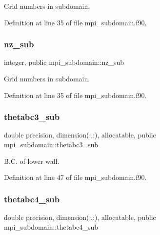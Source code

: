 Grid numbers in subdomain. 



Definition at line 35 of file mpi\+\_\+subdomain.\+f90.

\mbox{\label{namespacempi__subdomain_a07555cc931ac78376a4c81207662251f}} 
\subsubsection{\texorpdfstring{nz\_sub}{nz\_sub}}
{\footnotesize\ttfamily integer, public mpi\+\_\+subdomain\+::nz\+\_\+sub}



Grid numbers in subdomain. 



Definition at line 35 of file mpi\+\_\+subdomain.\+f90.

\mbox{\label{namespacempi__subdomain_ad61f27caf5f32301a077e21363c2d73b}} 
\subsubsection{\texorpdfstring{thetabc3\_sub}{thetabc3\_sub}}
{\footnotesize\ttfamily double precision, dimension(\+:,\+:), allocatable, public mpi\+\_\+subdomain\+::thetabc3\+\_\+sub}



B.\+C. of lower wall. 



Definition at line 47 of file mpi\+\_\+subdomain.\+f90.

\mbox{\label{namespacempi__subdomain_ad1705bede0c0d39ad16f9f94afe32be6}} 
\subsubsection{\texorpdfstring{thetabc4\_sub}{thetabc4\_sub}}
{\footnotesize\ttfamily double precision, dimension(\+:,\+:), allocatable, public mpi\+\_\+subdomain\+::thetabc4\+\_\+sub}



